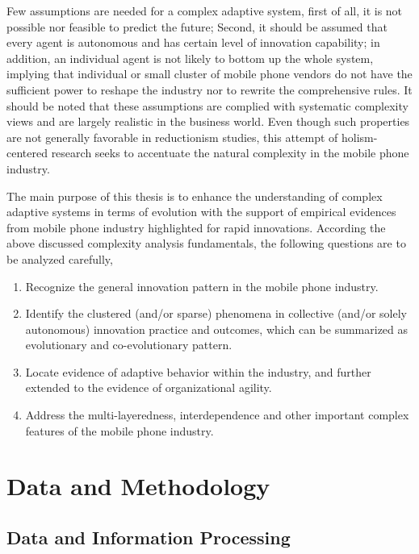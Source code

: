 \documentclass[utf8,english]{gradu3}
\begin{document}
Few assumptions are needed for a complex adaptive system, first of all, it is not possible nor feasible to predict the future; Second, it should be assumed that every agent is autonomous and has certain level of innovation capability; in addition, an individual agent is not likely to bottom up the whole system, implying that individual or small cluster of mobile phone vendors do not have the sufficient power to reshape the industry nor to rewrite the comprehensive rules. It should be noted that these assumptions are complied with systematic complexity views and are largely realistic in the business world. Even though such properties are not generally favorable in reductionism studies, this attempt of holism-centered research seeks to accentuate the natural complexity in the mobile phone industry.

The main purpose of this thesis is to enhance the understanding of complex adaptive systems in terms of evolution with the support of empirical evidences from mobile phone industry highlighted for rapid innovations. According the above discussed complexity analysis fundamentals, the following questions are to be analyzed carefully,

\begin{enumerate}
    \item Recognize the general innovation pattern in the mobile phone industry.
    \item Identify the clustered (and/or sparse) phenomena in collective (and/or solely autonomous) innovation practice and outcomes, which can be summarized as evolutionary and co-evolutionary pattern.
    \item Locate evidence of adaptive behavior within the industry, and further extended to the evidence of organizational agility.
    \item Address the multi-layeredness, interdependence and other important complex features of the mobile phone industry.
\end{enumerate}

\chapter{Data and Methodology}

\section{Data and Information Processing}
\end{document}

